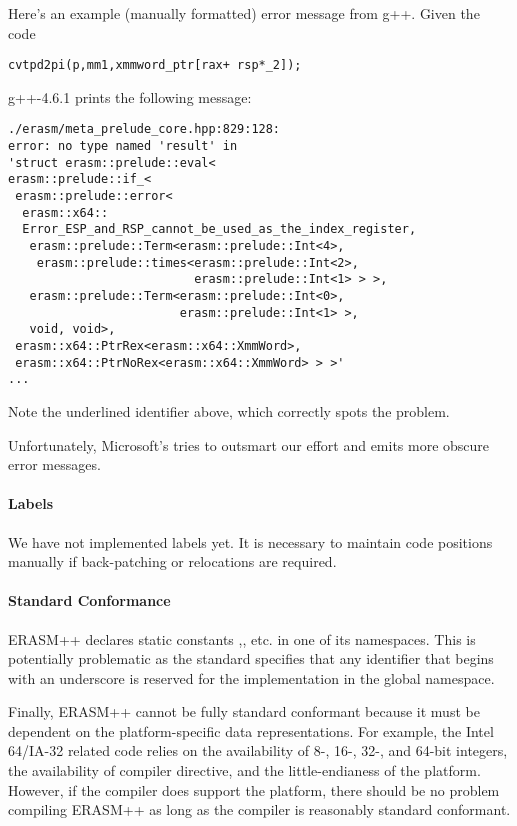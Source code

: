 \documentclass{article}
\begin{document}
Here's an example (manually formatted) error message from
g++. Given the code
\begin{lstlisting}[frame=single]
cvtpd2pi(p,mm1,xmmword_ptr[rax+ rsp*_2]);  
\end{lstlisting}
g++-4.6.1 prints the following message:
\begin{lstlisting}[emph={Error_ESP_and_RSP_cannot_be_used_as_the_index_register},emphstyle=\underbar]
./erasm/meta_prelude_core.hpp:829:128: 
error: no type named 'result' in 
'struct erasm::prelude::eval<
erasm::prelude::if_<
 erasm::prelude::error<
  erasm::x64::
  Error_ESP_and_RSP_cannot_be_used_as_the_index_register,
   erasm::prelude::Term<erasm::prelude::Int<4>, 
    erasm::prelude::times<erasm::prelude::Int<2>,
                          erasm::prelude::Int<1> > >,
   erasm::prelude::Term<erasm::prelude::Int<0>, 
                        erasm::prelude::Int<1> >,
   void, void>, 
 erasm::x64::PtrRex<erasm::x64::XmmWord>, 
 erasm::x64::PtrNoRex<erasm::x64::XmmWord> > >'
...
\end{lstlisting}
Note the underlined identifier above, which correctly spots the problem.

Unfortunately, Microsoft's  tries to outsmart our effort and emits
more obscure error messages.

\paragraph{Labels}
\label{sec:labels}

We have not implemented labels yet. It is necessary to maintain code positions manually
if back-patching or relocations are required.

\paragraph{Standard Conformance}
\label{sec:standard-conformance}

ERASM++ declares static constants ,, etc. in one of its namespaces. This
is potentially problematic as the standard specifies that any identifier that
begins with an underscore is reserved for the implementation in the global
namespace.

Finally, ERASM++ cannot be fully standard conformant because it must
be dependent on the platform-specific data representations. For
example, the Intel 64/IA-32 related code relies on the availability of
8-, 16-, 32-, and 64-bit integers, the availability of 
compiler directive, and the little-endianess of the platform.
However, if the compiler does support the platform, there should be no
problem compiling ERASM++ as long as the compiler is reasonably
standard conformant.
\end{document}
